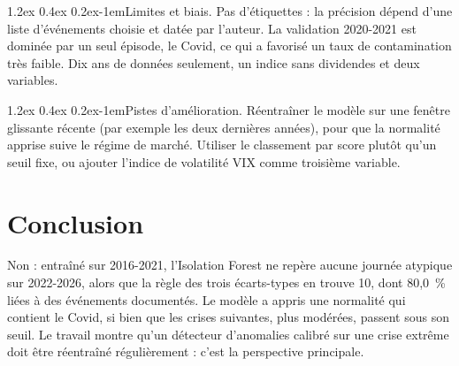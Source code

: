 \documentclass[11pt,a4paper]{article}
\makeatletter
\renewcommand\paragraph{\@startsection{paragraph}{4}{\z@}%
  {1.2ex \@plus 0.4ex \@minus 0.2ex}{-1em}{\normalfont\normalsize\bfseries}}
\makeatother
\begin{document}
\paragraph{Limites et biais.} Pas d'étiquettes : la précision dépend d'une liste d'événements choisie et datée par l'auteur. La validation 2020-2021 est dominée par un seul épisode, le Covid, ce qui a favorisé un taux de contamination très faible. Dix ans de données seulement, un indice sans dividendes et deux variables.

\paragraph{Pistes d'amélioration.} Réentraîner le modèle sur une fenêtre glissante récente (par exemple les deux dernières années), pour que la normalité apprise suive le régime de marché. Utiliser le classement par score plutôt qu'un seuil fixe, ou ajouter l'indice de volatilité VIX comme troisième variable.

\section{Conclusion}
\label{sec:conclusion}
Non : entraîné sur 2016-2021, l'Isolation Forest ne repère aucune journée atypique sur 2022-2026, alors que la règle des trois écarts-types en trouve 10, dont 80,0~\% liées à des événements documentés. Le modèle a appris une normalité qui contient le Covid, si bien que les crises suivantes, plus modérées, passent sous son seuil. Le travail montre qu'un détecteur d'anomalies calibré sur une crise extrême doit être réentraîné régulièrement : c'est la perspective principale.
\end{document}

